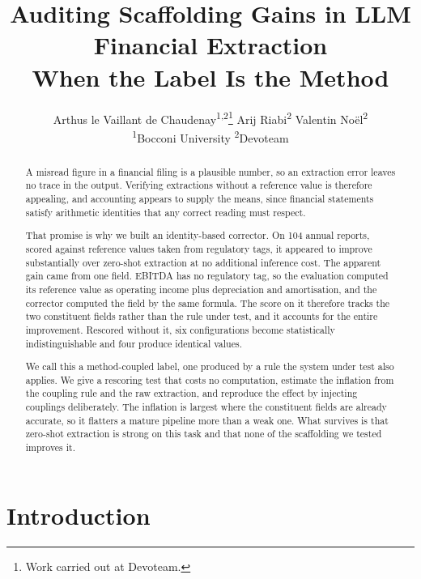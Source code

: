 \documentclass[11pt]{article}
\title{Auditing Scaffolding Gains in LLM Financial Extraction \\ When the Label Is the
Method}
\author{%
  Arthus le Vaillant de Chaudenay\textsuperscript{1,2}\thanks{Work carried out at
  Devoteam.} \quad
  Arij Riabi\textsuperscript{2} \quad
  Valentin No\"el\textsuperscript{2} \\[2pt]
  \textsuperscript{1}Bocconi University \quad
  \textsuperscript{2}Devoteam \\
}
\begin{document}
\maketitle

\raggedbottom

\begin{abstract}
A misread figure in a financial filing is a plausible number, so an extraction error
leaves no trace in the output. Verifying extractions without a reference value is
therefore appealing, and accounting appears to supply the means, since financial
statements satisfy arithmetic identities that any correct reading must respect.

That promise is why we built an identity-based corrector. On 104 annual reports, scored
against reference values taken from regulatory tags, it appeared to improve substantially
over zero-shot extraction at no additional inference cost. The apparent gain came from one
field. EBITDA has no regulatory tag, so the evaluation computed its reference value as
operating income plus depreciation and amortisation, and the corrector computed the field
by the same formula. The score on it therefore tracks the two
constituent fields rather than the rule under test, and it accounts for the entire
improvement. Rescored without it, six configurations become statistically
indistinguishable and four produce identical values.

We call this a method-coupled label, one produced by a rule the system under test also
applies. We give a rescoring test that costs no computation, estimate the inflation from
the coupling rule and the raw extraction, and reproduce the effect by injecting couplings
deliberately. The inflation is largest where the constituent fields
are already accurate, so it flatters a mature pipeline more than a weak one. What
survives is that zero-shot extraction is strong on this task and that none of the
scaffolding we tested improves it.
\end{abstract}

\section{Introduction}
\end{document}
